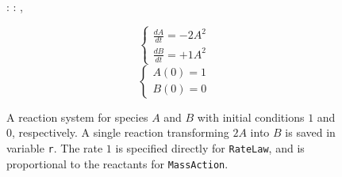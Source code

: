 \begin{figure}[t]
\begin{minipage}[t]{\columnwidth}
\begin{minipage}[c]{0.75\columnwidth}
\begin{CodeInput}
\begin{Highlighting}[]
: \OperatorTok{=}\KeywordTok{(}\OperatorTok{=}\KeywordTok{)}
: \OperatorTok{=}\KeywordTok{(}\OperatorTok{=}\KeywordTok{)}
\OperatorTok{=}\KeywordTok{(}
\OperatorTok{=}\KeywordTok{[} \OperatorTok{*}\KeywordTok{]},
\OperatorTok{=}\NormalTok{\KeywordTok{[}B\KeywordTok{]},}
\OperatorTok{=}\NormalTok{,}
\KeywordTok{    )}
            \end{Highlighting}
            \end{CodeInput}
        \end{minipage}%
        \begin{minipage}[c]{0.25\columnwidth}
            \[
            \begin{cases}
                \frac{dA}{dt} = -2 A^2 \\
                \frac{dB}{dt} = +1 A^2
            \end{cases}
            \]
            \[
            \begin{cases}
                A(0) = 1 \\
                B(0) = 0
            \end{cases}
            \]
        \end{minipage}%
    \end{minipage}%
    
    \caption{
      A reaction system for species \(A\) and \(B\)
      with initial conditions \(1\) and \(0\), respectively. A single reaction
      transforming \(2A\) into \(B\) is saved in variable \texttt{r}. The rate
      \(1\) is specified directly for \texttt{RateLaw}, and is proportional to
      the reactants for \texttt{MassAction}.
    }
    \label{fig-simbio}
  \end{figure}
  
